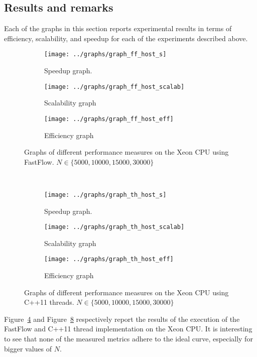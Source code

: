 \subsection{Results and remarks} \label{subsec:results}
Each of the graphs in this section reports experimental results in terms of efficiency, scalability, and speedup for each of the experiments described above.
\begin{figure}[h]
	\centering
	\begin{subfigure}[b]{0.3\linewidth}
		\texttt{[image: ../graphs/graph\_ff\_host\_s]}
		\caption{Speedup graph.}
		\label{fig:ff_host_s}
	\end{subfigure}
	\begin{subfigure}[b]{0.3\linewidth}
		\texttt{[image: ../graphs/graph\_ff\_host\_scalab]}
		\caption{Scalability graph}
		\label{fig:ff_host_scalab}
	\end{subfigure}
	\begin{subfigure}[b]{0.3\linewidth}
		\texttt{[image: ../graphs/graph\_ff\_host\_eff]}
		\caption{Efficiency graph}
		\label{fig:ff_host_eff}
	\end{subfigure}
	\caption{Graphs of different performance measures on the Xeon CPU using FastFlow. $N \in \{ 5000, 10000, 15000, 30000\}$}
	\label{fig:ff_host}
\end{figure}
~
\begin{figure}[h]
	\centering
	\begin{subfigure}[b]{0.3\textwidth}
		\texttt{[image: ../graphs/graph\_th\_host\_s]}
		\caption{Speedup graph.}
		\label{fig:th_host_s}
	\end{subfigure}
	\begin{subfigure}[b]{0.3\textwidth}
		\texttt{[image: ../graphs/graph\_th\_host\_scalab]}
		\caption{Scalability graph}
		\label{fig:th_host_scalab}
	\end{subfigure}
	\begin{subfigure}[b]{0.3\textwidth}
		\texttt{[image: ../graphs/graph\_th\_host\_eff]}
		\caption{Efficiency graph}
		\label{fig:th_host_eff}
	\end{subfigure}
	\caption{Graphs of different performance measures on the Xeon CPU using C++11 threads. $N \in \{ 5000, 10000, 15000, 30000\}$}
	\label{fig:th_host}
\end{figure}

Figure~\ref{fig:ff_host} and Figure~\ref{fig:th_host} respectively report the results of the execution of the FastFlow and C++11 thread implementation on the Xeon CPU.
It is interesting to see that none of the measured metrics adhere to the ideal curve, especially for bigger values of $N$.

